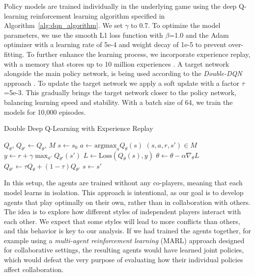         \noindent
        Policy models are trained individually in the underlying game using the deep Q-learning reinforcement learning algorithm specified in Algorithm~\ref{alg:dqn_algorithm}. We set $\gamma$ to 0.7. To optimize the model parameters, we use the smooth L1 loss function with $\beta$=1.0 and the Adam optimizer with a learning rate of 5e-4 and weight decay of 1e-5 to prevent over-fitting. To further enhance the learning process, we incorporate experience replay, with a memory that stores up to 10 million experiences \cite{10.1007/BF00992699}. A target network alongside the main policy network, is being used according to the \emph{Double-DQN} approach \cite{vanhasselt2015deep}. To update the target network we apply a soft update with a factor $\tau$=5e-3. This gradually brings the target network closer to the policy network, balancing learning speed and stability. With a batch size of 64, we train the models for 10,000 episodes.
        \begin{algorithm}
            \caption{Double Deep Q-Learning with Experience Replay}
            \label{alg:dqn_algorithm}
            \begin{algorithmic}[1]
            \State $Q_\theta$, $Q_{\theta'} \gets Q_\theta$, $M$ 
                \State $s \gets s_{0}$
                    \State $a \gets \text{argmax}_a Q_\theta(s)$ 
                    \State $(s, a, r, s') \in M$ 
                         
                            \State $y \gets r + \gamma \max_{a'} Q_{\theta'}(s')$
                            \State $L \gets \text{Loss}(Q_\theta(s), y)$
                            \State $\theta \gets \theta - \alpha \nabla_\theta L$
                        \EndFor
                    \EndIf
                    \State $Q_{\theta'} \gets \tau Q_\theta + (1 - \tau) Q_{\theta'}$ 
                    \State $s \gets s'$
                \EndFor
            \EndFor
            \end{algorithmic}
        \end{algorithm}

        \noindent
        In this setup, the agents are trained without any co-players, meaning that each model learns in isolation. This approach is intentional, as our goal is to develop agents that play optimally on their own, rather than in collaboration with others. The idea is to explore how different styles of independent players interact with each other. We expect that some styles will lead to more conflicts than others, and this behavior is key to our analysis. If we had trained the agents together, for example using a \emph{multi-agent reinforcement learning} (MARL) approach designed for collaborative settings, the resulting agents would have learned joint policies, which would defeat the very purpose of evaluating how their individual  policies affect collaboration.\tinydouble

